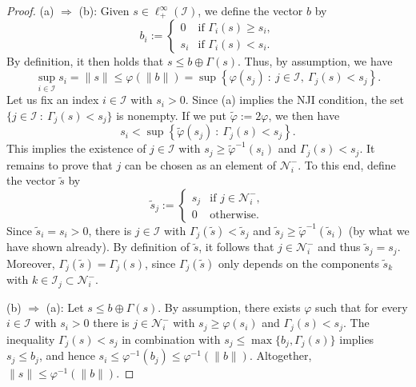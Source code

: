 \documentclass[10pt, oneside, a4paper]{article}
\newcommand{\IC}{\mathcal{I}}
\newcommand{\NC}{\mathcal{N}}
\begin{document}
\begin{proof}
(a) $\Rightarrow$ (b): Given $s \in \ell^{\infty}_+(\IC)$, we define the vector $b$ by%
\begin{equation*}
  b_i := \left\{\begin{array}{cc} 
	                  0 & \mbox{if } \Gamma_i(s) \geq s_i, \\
										s_i & \mbox{if } \Gamma_i(s) < s_i.
							  \end{array}\right.%
\end{equation*}
By definition, it then holds that $s \leq b \oplus \Gamma(s)$. Thus, by assumption, we have%
\begin{equation*}
  \sup_{i\in\IC}s_i = \|s\| \leq \varphi(\|b\|) = \sup\left\{ \varphi(s_j)\ :\ j \in \IC,\ \Gamma_j(s) < s_j \right\}.%
\end{equation*}
Let us fix an index $i \in \IC$ with $s_i > 0$. Since (a) implies the NJI condition, the set $\{ j \in \IC\ :\ \Gamma_j(s) < s_j \}$ is nonempty. If we put $\tilde{\varphi} := 2\varphi$, we then have%
\begin{equation*}
  s_i < \sup\left\{ \tilde{\varphi}(s_j)\ :\ \Gamma_j(s) < s_j \right\}.%
\end{equation*}
This implies the existence of $j \in \IC$ with $s_j \geq \tilde{\varphi}^{-1}(s_i)$ and $\Gamma_j(s) < s_j$. It remains to prove that $j$ can be chosen as an element of $\NC^-_i$. To this end, define the vector $\tilde{s}$ by%
\begin{equation*}
  \tilde{s}_j := \left\{ \begin{array}{cc}
	                                s_j & \mbox{if } j \in \NC^-_i, \\
																	  0 & \mbox{otherwise}.
													\end{array}\right.%
\end{equation*}
Since $\tilde{s}_i = s_i > 0$, there is $j \in \IC$ with $\Gamma_j(\tilde{s}) < \tilde{s}_j$ and $\tilde{s}_j \geq \tilde{\varphi}^{-1}(\tilde{s}_i)$ (by what we have shown already). By definition of $\tilde{s}$, it follows that $j \in \NC^-_i$ and thus $\tilde{s}_j = s_j$. Moreover, $\Gamma_j(\tilde{s}) = \Gamma_j(s)$, since $\Gamma_j(\tilde{s})$ only depends on the components $\tilde{s}_k$ with $k \in \IC_j \subset \NC^-_i$.%

(b) $\Rightarrow$ (a): Let $s \leq b \oplus \Gamma(s)$. By assumption, there exists $\varphi$ such that for every $i \in \IC$ with $s_i > 0$ there is $j \in \NC^-_i$ with $s_j \geq \varphi(s_i)$ and $\Gamma_j(s) < s_j$. The inequality $\Gamma_j(s) < s_j$ in combination with $s_j \leq \max\{b_j,\Gamma_j(s)\}$ implies $s_j \leq b_j$, and hence $s_i \leq \varphi^{-1}(b_j) \leq \varphi^{-1}(\|b\|)$. Altogether, $\|s\| \leq \varphi^{-1}(\|b\|)$.
\end{proof}
\end{document}
